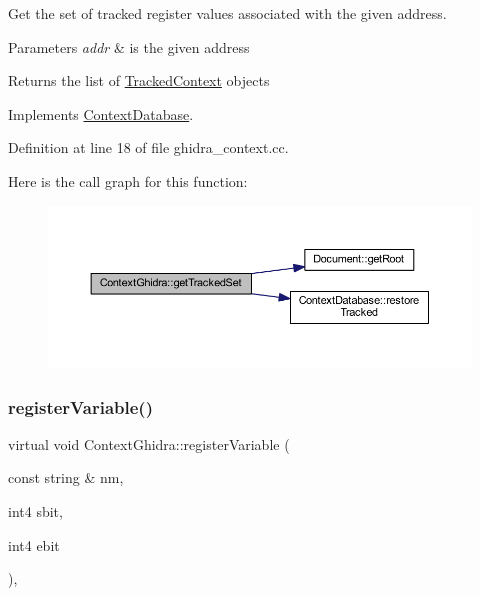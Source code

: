 Get the set of tracked register values associated with the given address. 


\begin{DoxyParams}{Parameters}
{\em addr} & is the given address \\
\hline
\end{DoxyParams}
\begin{DoxyReturn}{Returns}
the list of \mbox{\hyperlink{struct_tracked_context}{Tracked\+Context}} objects 
\end{DoxyReturn}


Implements \mbox{\hyperlink{class_context_database_a6ea1e4b793286c0b1ecbafcc58422339}{Context\+Database}}.



Definition at line 18 of file ghidra\+\_\+context.\+cc.

Here is the call graph for this function\+:
\nopagebreak
\begin{figure}[H]
\begin{center}
\leavevmode
\includegraphics[width=350pt]{class_context_ghidra_a4f6d11b1a9dd101791a11ee522139828_cgraph}
\end{center}
\end{figure}
\mbox{\label{class_context_ghidra_ab71324da92653ec926463cf81b741432}} 
\subsubsection{\texorpdfstring{registerVariable()}{registerVariable()}}
{\footnotesize\ttfamily virtual void Context\+Ghidra\+::register\+Variable (\begin{DoxyParamCaption}\item[{const string \&}]{nm,  }\item[{int4}]{sbit,  }\item[{int4}]{ebit }\end{DoxyParamCaption})\hspace{0.3cm}{\ttfamily [inline]}, {\ttfamily [virtual]}}



